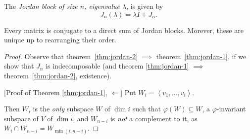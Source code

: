 \begin{definition}
	The \emph{Jordan block of size $n$, eigenvalue $\lambda$}, is given by
	\begin{equation*}
		J_n(\lambda) = \lambda I + J_n.
	\end{equation*}
\end{definition}

\begin{theorem}
	 Every matrix is conjugate to a direct sum of Jordan blocks. Morever, these are unique up to rearranging their order.
	\label{thm:jordan-2}
\end{theorem}

\begin{proof}
Observe that theorem~\ref{thm:jordan-2} $\implies$ theorem~\ref{thm:jordan-1}, if we show that $J_n$ is indecomposable (and theorem \ref{thm:jordan-1} $\implies$ theorem~\ref{thm:jordan-2}, existence).
	

	[Proof of Theorem \ref{thm:jordan-1}, $\Leftarrow$] 
	Put $W_i=\left\langle v_1,\dots,v_i \right\rangle$.
	
	Then $W_i$ is the \emph{only} subspace $W$ of $\dim i$ such that $\varphi(W)\subseteq W$, a $\varphi$-invariant subspace of $V$ of $\dim i$, 
	and $W_{n-i}$ is \emph{not} a complement to it, as $W_i \cap W_{n-i} = W_{\min(i,n-i)}$.
\end{proof}

